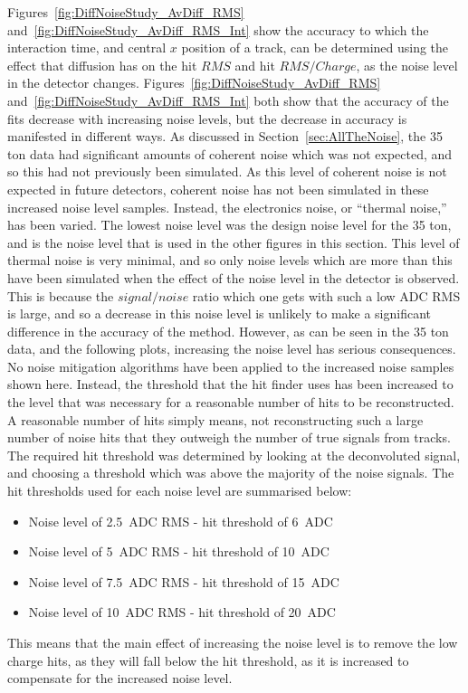 Figures~\ref{fig:DiffNoiseStudy_AvDiff_RMS} and~\ref{fig:DiffNoiseStudy_AvDiff_RMS_Int} show the accuracy to which the interaction time, and central $x$ position of a track, can be determined using the effect that diffusion has on the hit $RMS$ and hit $RMS/Charge$, as the noise level in the detector changes. Figures~\ref{fig:DiffNoiseStudy_AvDiff_RMS} and~\ref{fig:DiffNoiseStudy_AvDiff_RMS_Int} both show that the accuracy of the fits decrease with increasing noise levels, but the decrease in accuracy is manifested in different ways. As discussed in Section~\ref{sec:AllTheNoise}, the 35 ton data had significant amounts of coherent noise which was not expected, and so this had not previously been simulated. As this level of coherent noise is not expected in future detectors, coherent noise has not been simulated in these increased noise level samples. Instead, the electronics noise, or ``thermal noise,'' has been varied. The lowest noise level was the design noise level for the 35 ton, and is the noise level that is used in the other figures in this section. This level of thermal noise is very minimal, and so only noise levels which are more than this have been simulated when the effect of the noise level in the detector is observed. This is because the $signal/noise$ ratio which one gets with such a low ADC RMS is large, and so a decrease in this noise level is unlikely to make a significant difference in the accuracy of the method. However, as can be seen in the 35 ton data, and the following plots, increasing the noise level has serious consequences. \\

No noise mitigation algorithms have been applied to the increased noise samples shown here. Instead, the threshold that the hit finder uses has been increased to the level that was necessary for a reasonable number of hits to be reconstructed. A reasonable number of hits simply means, not reconstructing such a large number of noise hits that they outweigh the number of true signals from tracks. The required hit threshold was determined by looking at the deconvoluted signal, and choosing a threshold which was above the majority of the noise signals. The hit thresholds used for each noise level are summarised below:
\begin{itemize}
\item Noise level of 2.5~ADC RMS - hit threshold of 6~ADC
\item Noise level of 5~ADC RMS - hit threshold of 10~ADC
\item Noise level of 7.5~ADC RMS - hit threshold of 15~ADC
\item Noise level of 10~ADC RMS - hit threshold of 20~ADC
\end{itemize}
This means that the main effect of increasing the noise level is to remove the low charge hits, as they will fall below the hit threshold, as it is increased to compensate for the increased noise level. \\

